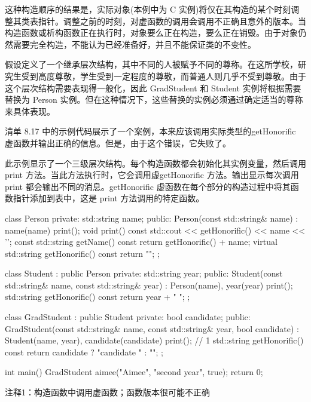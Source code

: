 这种构造顺序的结果是，实际对象(本例中为 C 实例)将仅在其构造的某个时刻调整其类表指针。调整之前的时刻，对虚函数的调用会调用不正确且意外的版本。当构造函数或析构函数正在执行时，对象要么正在构造，要么正在销毁。由于对象仍然需要完全构造，不能认为已经准备好，并且不能保证类的不变性。


假设定义了一个继承层次结构，其中不同的人被赋予不同的尊称。在这所学校，研究生受到高度尊敬，学生受到一定程度的尊敬，而普通人则几乎不受到尊敬。由于这个层次结构需要表现得一般化，因此 GradStudent 和 Student 实例将根据需要替换为 Person 实例。但在这种情况下，这些替换的实例必须通过确定适当的尊称来具体表现。

清单 8.17 中的示例代码展示了一个案例，本来应该调用实际类型的getHonorific 虚函数并输出正确的信息。但是，由于这个错误，它失败了。

此示例显示了一个三级层次结构。每个构造函数都会初始化其实例变量，然后调用 print 方法。当此方法执行时，它会调用虚getHonorific 方法。输出显示每次调用 print 都会输出不同的消息。getHonorific 虚函数在每个部分的构造过程中将其函数指针添加到表中，这是 print 方法调用的特定函数。


\begin{cpp}
class Person {
private:
  std::string name;
public:
  Person(const std::string& name) :
  name(name) { print(); }
  void print() const { std::cout << getHonorific() << name << '\n'; }
  const std::string getName() const { return getHonorific() + name; }
  virtual std::string getHonorific() const { return ""; }
};

class Student : public Person {
private:
  std::string year;
public:
  Student(const std::string& name, const std::string& year) : Person(name),
    year(year) { print(); }
  std::string getHonorific() const { return year + " "; }
};

class GradStudent : public Student {
private:
  bool candidate;
public:
  GradStudent(const std::string& name, const std::string& year,
    bool candidate) : Student(name, year), candidate(candidate)
  { print(); } // 1
  std::string getHonorific() const {
    return candidate ? "candidate " : "";
  }
};

int main() {
  GradStudent aimee("Aimee", "second year", true);
  return 0;
}
\end{cpp}

{\footnotesize
注释1：构造函数中调用虚函数；函数版本很可能不正确
}



